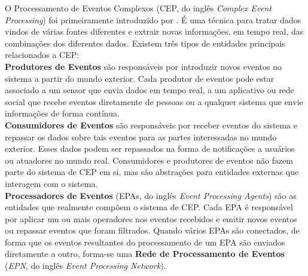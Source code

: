 O Processamento de Eventos Complexos (CEP, do inglês \textit{Complex Event Processing}) foi primeiramente introduzido por \cite{Luckham:2001:PEI:515781}. É uma técnica para tratar dados vindos de várias fontes diferentes e extrair novas informações, em tempo real, das combinações dos diferentes dados. 
Existem três tipos de entidades principais relacionados a CEP: \\

\textbf{Produtores de Eventos} são responsáveis por introduzir novos eventos no sistema a partir do mundo exterior. Cada produtor de eventos pode estar associado a um sensor que envia dados em tempo real, a um aplicativo ou rede social que recebe eventos diretamente de pessoas ou a qualquer sistema que envie informações de forma contínua. \\

\textbf{Consumidores de Eventos} são responsáveis por receber eventos do sistema e repassar os dados sobre tais eventos para as partes interessadas no mundo exterior. Esses dados podem ser repassados na forma de notificações a usuários ou atuadores no mundo real. Consumidores e produtores de eventos não fazem parte do sistema de CEP em si, mas são abstrações para entidades externas que interagem com o sistema. \\

\textbf{Processadores de Eventos}  (EPAs, do inglês \textit{Event Processing Agents}) são as entidades que realmente compõem o sistema de CEP. Cada EPA é responsável por aplicar um ou mais operadores nos eventos recebidos e emitir novos eventos ou repassar eventos que foram filtrados. Quando vários EPAs são conectados, de forma que os eventos resultantes do processamento de um EPA são enviados diretamente a outro, forma-se uma \textbf{Rede de Processamento de Eventos} \label{EPN} (\textit{EPN}, do inglês \textit{Event Processing Network}). \\

